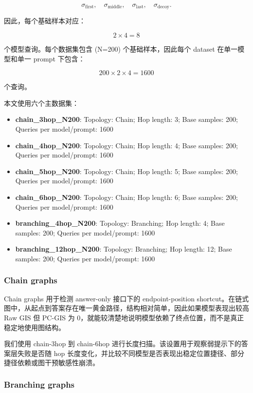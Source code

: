 \documentclass[
  11pt,
]{article}
\providecommand{\tightlist}{%
  \setlength{\itemsep}{0pt}\setlength{\parskip}{0pt}}
\begin{document}
\[
\sigma_{\text{first}},  
\quad  
\sigma_{\text{middle}},  
\quad  
\sigma_{\text{last}},  
\quad  
\sigma_{\text{decoy}}.  
\]

因此，每个基础样本对应：

\[
2 \times 4 = 8  
\]

个模型查询。每个数据集包含 (N=200) 个基础样本，因此每个 dataset
在单一模型和单一 prompt 下包含：

\[
200 \times 2 \times 4 = 1600  
\]

个查询。

本文使用六个主数据集：

\begin{itemize}
\tightlist
\item
  \textbf{chain\_3hop\_N200}: Topology: Chain; Hop length: 3; Base
  samples: 200; Queries per model/prompt: 1600
\item
  \textbf{chain\_4hop\_N200}: Topology: Chain; Hop length: 4; Base
  samples: 200; Queries per model/prompt: 1600
\item
  \textbf{chain\_5hop\_N200}: Topology: Chain; Hop length: 5; Base
  samples: 200; Queries per model/prompt: 1600
\item
  \textbf{chain\_6hop\_N200}: Topology: Chain; Hop length: 6; Base
  samples: 200; Queries per model/prompt: 1600
\item
  \textbf{branching\_4hop\_N200}: Topology: Branching; Hop length: 4;
  Base samples: 200; Queries per model/prompt: 1600
\item
  \textbf{branching\_12hop\_N200}: Topology: Branching; Hop length: 12;
  Base samples: 200; Queries per model/prompt: 1600
\end{itemize}

\subsubsection{Chain graphs}\label{chain-graphs}

Chain graphs 用于检测 answer-only 接口下的 endpoint-position
shortcut。在链式图中，从起点到答案存在唯一黄金路径，结构相对简单，因此如果模型表现出较高
Raw GIS 但 PC-GIS 为
0，就能较清楚地说明模型依赖了终点位置，而不是真正稳定地使用图结构。

我们使用 chain-3hop 到 chain-6hop
进行长度扫描。该设置用于观察弱提示下的答案层失败是否随 hop
长度变化，并比较不同模型是否表现出稳定位置捷径、部分捷径依赖或图干预敏感性崩溃。

\subsubsection{Branching graphs}\label{branching-graphs}
\end{document}
